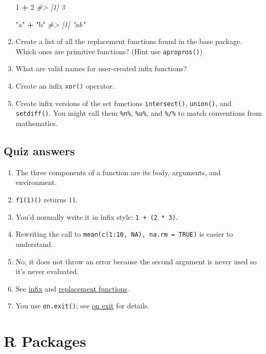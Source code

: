 \documentclass[]{book}
\newenvironment{Shaded}{\begin{snugshade}}{\end{snugshade}}
\newcommand{\DecValTok}[1]{\textcolor[rgb]{0.00,0.00,0.81}{#1}}
\newcommand{\StringTok}[1]{\textcolor[rgb]{0.31,0.60,0.02}{#1}}
\newcommand{\CommentTok}[1]{\textcolor[rgb]{0.56,0.35,0.01}{\textit{#1}}}
\newcommand{\OperatorTok}[1]{\textcolor[rgb]{0.81,0.36,0.00}{\textbf{#1}}}
\theoremstyle{definition}
\theoremstyle{definition}
\theoremstyle{definition}
\theoremstyle{remark}
\begin{document}
\begin{enumerate}
\begin{Shaded}
\begin{Highlighting}[]
\DecValTok{1} \OperatorTok{+}\StringTok{ }\DecValTok{2}
\CommentTok{#> [1] 3}

\StringTok{"a"} \OperatorTok{+}\StringTok{ "b"}
\CommentTok{#> [1] "ab"}
\end{Highlighting}
\end{Shaded}
\item
  Create a list of all the replacement functions found in the base
  package. Which ones are primitive functions? (Hint use
  \texttt{apropros()})
\item
  What are valid names for user-created infix functions?
\item
  Create an infix \texttt{xor()} operator.
\item
  Create infix versions of the set functions \texttt{intersect()},
  \texttt{union()}, and \texttt{setdiff()}. You might call them
  \texttt{\%n\%}, \texttt{\%u\%}, and \texttt{\%/\%} to match
  conventions from mathematics.
\end{enumerate}

\section{Quiz answers}\label{function-answers}

\begin{enumerate}
\def\labelenumi{\arabic{enumi}.}
\item
  The three components of a function are its body, arguments, and
  environment.
\item
  \texttt{f1(1)()} returns 11.
\item
  You'd normally write it in infix style: \texttt{1\ +\ (2\ *\ 3)}.
\item
  Rewriting the call to \texttt{mean(c(1:10,\ NA),\ na.rm\ =\ TRUE)} is
  easier to understand.
\item
  No, it does not throw an error because the second argument is never
  used so it's never evaluated.
\item
  See \protect\hyperlink{infix-functions}{infix} and
  \protect\hyperlink{replacement-functions}{replacement functions}.
\item
  You use \texttt{on.exit()}; see \protect\hyperlink{on-exit}{on exit}
  for details.
\end{enumerate}

\chapter{R Packages}\label{r-packages}
\end{document}
